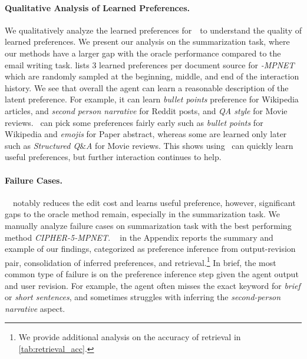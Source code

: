 \paragraph{Qualitative Analysis of Learned Preferences.} We qualitatively analyze the learned preferences for~\algname~to understand the quality of learned preferences. We present our analysis on the summarization task, where our methods have a larger gap with the oracle performance compared to the email writing task.  lists 3 learned preferences per document source for \textit{-MPNET} which are randomly sampled at the beginning, middle, and end of the interaction history. We see that overall the agent can learn a reasonable description of the latent preference. For example, it can learn \emph{bullet points} preference for Wikipedia articles, and \emph{second person narrative} for Reddit posts, and \emph{QA style} for Movie reviews. \algname~can pick some preferences fairly early such as \emph{bullet points} for Wikipedia and \emph{emojis} for Paper abstract, whereas some are learned only later such as \emph{Structured Q$\&$A} for Movie reviews. This shows using \algname~can quickly learn useful preferences, but further interaction continues to help.


\paragraph{Failure Cases.}~\algname~notably reduces the edit cost and learns useful preference, however, significant gaps to the oracle method remain, especially in the summarization task. 
We manually analyze failure cases on summarization task with the best performing method \textit{CIPHER-5-MPNET}. ~ in the Appendix reports the summary and example of our findings, categorized as preference inference from output-revision pair, consolidation of inferred preferences, and retrieval.\footnote{We provide additional analysis on the accuracy of retrieval in \autoref{tab:retrieval_acc}.} In brief, the most common type of failure is on the preference inference step given the agent output and user revision. For example, the agent often misses the exact keyword for \textit{brief} or \textit{short sentences}, and sometimes struggles with inferring the \textit{second-person narrative} aspect.



